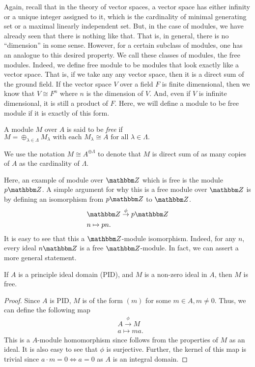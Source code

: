 Again, recall that in the theory of vector spaces, a vector space has either infinity or a unique integer assigned to it, which is the cardinality of minimal generating set or a maximal linearly independent set. But, in the case of modules, we have already seen that there is nothing like that. That is, in general, there is no ``dimension'' in some sense. However, for a certain subclass of modules, one has an analogue to this desired property. We call these classes of modules, the free modules. Indeed, we define free module to be modules that look exactly like a vector space. That is, if we take any any vector space, then it is a direct sum of the ground field. If the vector space $V$ over a field $F$ is finite dimensional, then we know that $V \cong F^{n}$ where $n$ is the dimension of $V$. And, even if $V$ is infinite dimensional, it is still a product of $F$. Here, we will define a module to be free module if it is exactly of this form. 
\begin{definition}
    A module $M$ over $A$ is said to be {\it free} if 
    \(
    M=\oplus_{\lambda \in \Lambda} M_{\lambda}
    \text{ with each }
    M_{\lambda} \cong A\text{ for all }\lambda \in \Lambda. 
    \)
    
    We use the notation $M \cong A^{\oplus \Lambda}$ to denote that $M$ is direct sum of as many copies of $A$ as the cardinality of $\Lambda$.
\end{definition}

Here, an example of module over ${\Z}$ which is free is the module $p {\Z}$. A simple argument for why this is a free module over $\Z$ is by defining an isomorphism from $p {\Z}$ to $\Z$. 
$$
\begin{aligned}
& {\Z} \stackrel{\phi}{\rightarrow} p {\Z} \\
& n \mapsto p n .
\end{aligned}
$$
It is easy to see that this a $\Z$-module isomorphism. Indeed, for any ${n}$, every ideal $n\Z$ is a free ${\Z}$-module. In fact, we can assert a more general statement.
\begin{proposition}
    If $A$ is a principle ideal domain (PID), and $M$ is a non-zero ideal in $A$, then $M$ is free.
\end{proposition} 
\begin{proof}
    Since $A$ is PID, $M$ is of the form $(m)$ for some $m \in A, m \neq 0$. Thus, we can define the following  map
    \[
    \begin{aligned}
    & {A} \stackrel{\phi}{\rightarrow} {M} \\
    & a \mapsto m a .
    \end{aligned}
    \]
    This is a $A$-module homomorphism since follows from the properties of $M$ as an ideal. It is also easy to see that $\phi$ is surjective.  Further, the kernel of this map is trivial since $a\cdot m = 0 \iff a = 0$ as $A$ is an integral domain. 
\end{proof}

